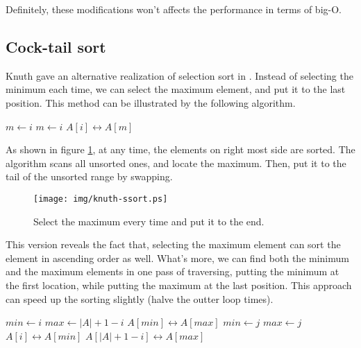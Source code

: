 \documentclass{article}
\begin{document}
Definitely, these modifications won't affects the performance in terms of big-O.

\subsection{Cock-tail sort}

Knuth gave an alternative realization of selection sort in \cite{TAOCP}. Instead of selecting the
minimum each time, we can select the maximum element, and put it to the last position. This method
can be illustrated by the following algorithm.

\begin{algorithmic}
    \State $m \gets i$
        \State $m \gets i$
      \EndIf
    \EndFor
    \State {} $A[i] \leftrightarrow A[m]$
  \EndFor
\EndProcedure
\end{algorithmic}

As shown in figure \ref{fig:knuth-ssort}, at any time, the elements on right most side
are sorted. The algorithm scans all unsorted ones, and locate the maximum. Then, put
it to the tail of the unsorted range by swapping.

\begin{figure}[htbp]
  \centering
  \texttt{[image: img/knuth-ssort.ps]}
  \caption{Select the maximum every time and put it to the end.}
  \label{fig:knuth-ssort}
\end{figure}

This version reveals the fact that, selecting the maximum element can sort the element in
ascending order as well. What's more, we can find both the minimum and the maximum elements
in one pass of traversing, putting the minimum at the first location, while putting the
maximum at the last position. This approach can speed up the sorting slightly (halve the
outter loop times).

\begin{algorithmic}
    \State $min \gets i$
    \State $max \gets |A| + 1 - i$
      \State {} $A[min] \leftrightarrow A[max]$
    \EndIf
        \State $min \gets j$
      \EndIf
        \State $max \gets j$
      \EndIf
    \EndFor
    \State {} $A[i] \leftrightarrow A[min]$
    \State {} $A[|A|+1-i] \leftrightarrow A[max]$
  \EndFor
\EndProcedure
\end{algorithmic}
\end{document}
